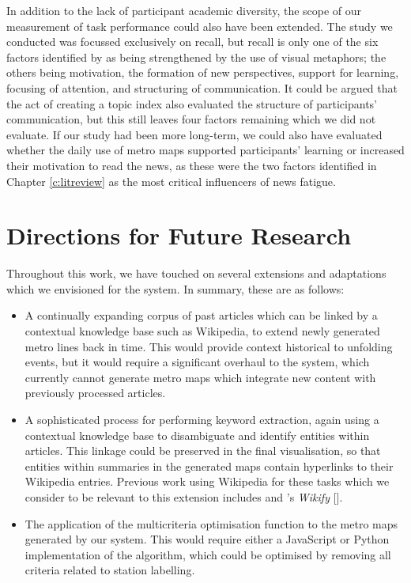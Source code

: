 In addition to the lack of participant academic diversity, the scope of our measurement of task performance could also have been extended. The study we conducted was focussed exclusively on recall, but recall is only one of the six factors identified by \cite{VisuelleKommunikation} as being strengthened by the use of visual metaphors; the others being motivation, the formation of new perspectives, support for learning, focusing of attention, and structuring of communication. It could be argued that the act of creating a topic index also evaluated the structure of participants' communication, but this still leaves four factors remaining which we did not evaluate. If our study had been more long-term, we could also have evaluated whether the daily use of metro maps supported participants' learning or increased their motivation to read the news, as these were the two factors identified in Chapter \ref{c:litreview} as the most critical influencers of news fatigue.


\section{Directions for Future Research}

Throughout this work, we have touched on several extensions and adaptations which we envisioned for the system. In summary, these are as follows:
\begin{itemize}
	\item A continually expanding corpus of past articles which can be linked by a contextual knowledge base such as Wikipedia, to extend newly generated metro lines back in time. This would provide context historical to unfolding events, but it would require a significant overhaul to the system, which currently cannot generate metro maps which integrate new content with previously processed articles.
	\item A sophisticated process for performing keyword extraction, again using a contextual knowledge base to disambiguate and identify entities within articles. This linkage could be preserved in the final visualisation, so that entities within summaries in the generated maps contain hyperlinks to their Wikipedia entries. Previous work using Wikipedia for these tasks which we consider to be relevant to this extension includes \citep{LearningToLink} and \citeauthor{Wikify}'s \textit{Wikify} [\citeyear{Wikify}].
	\item The application of the \cite[\citeyear{AutomaticMetroMapLayoutThesis}]{AutomaticMetroMapLayout} multicriteria optimisation function to the metro maps generated by our system. This would require either a JavaScript or Python implementation of the algorithm, which could be optimised by removing all criteria related to station labelling.
\end{itemize}

